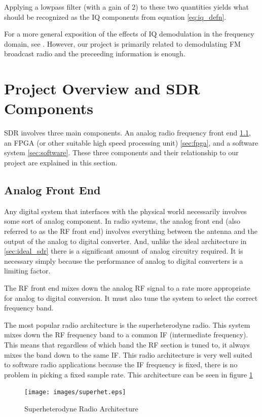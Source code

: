 \documentclass[a4paper, 12pt, notitlepage]{article}
\begin{document}
Applying a lowpass filter (with a gain of 2) to these two quantities yields what should be recognized as the IQ components from equation \ref{eq:iq_defn}.

For a more general exposition of the effects of IQ demodulation in the frequency domain, see \cite{iq_sampling}.  However, our project is primarily related to demodulating FM broadcast radio and the preceeding information is enough.

\section{Project Overview and SDR Components}
SDR involves three main components.  An analog radio frequency front end \ref{sec:analog_frontend}, an FPGA (or other suitable high speed processing unit) \ref{sec:fpga}, and a software system \ref{sec:software}.  These three components and their relationship to our project are explained in this section.

\subsection{Analog Front End}
\label{sec:analog_frontend}
Any digital system that interfaces with the physical world necessarily involves some sort of analog component.  In radio systems, the analog front end (also referred to as the RF front end) involves everything between the antenna and the output of the analog to digital converter.  And, unlike the ideal architecture in \ref{sec:ideal_sdr} there is a significant amount of analog circuitry required.  It is necessary simply because the performance of analog to digital converters is a limiting factor.

The RF front end mixes down the analog RF signal to a rate more appropriate for analog to digital conversion.  It must also tune the system to select the correct frequency band.

The most popular radio architecture is the superheterodyne radio.  This system mixes down the RF frequency band to a common IF (intermediate frequency).  This means that regardless of which band the RF section is tuned to, it always mixes the band down to the same IF.  This radio architecture is very well suited to software radio applications because the IF frequency is fixed, there is no problem in picking a fixed sample rate.  This architecture can be seen in figure \ref{fig:superhet}

\begin{figure}
  \centering
  \caption{Superheterodyne Radio Architecture}
  \label{fig:superhet}
  \texttt{[image: images/superhet.eps]}
\end{figure}
\end{document}
